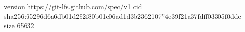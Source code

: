 version https://git-lfs.github.com/spec/v1
oid sha256:65296d6a6db01d292f80b01e06ad1d3b236210774e39f21a37fdff03305f0dde
size 65632
